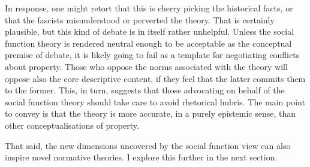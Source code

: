 In response, one might retort that this is cherry picking the historical facts, or that the fascists misunderstood or perverted the theory. That is certainly plausible, but this kind of debate is in itself rather unhelpful. Unless the social function theory is rendered neutral enough to be acceptable as the conceptual premise of debate, it is likely going to fail as a template for negotiating conflicts about property. Those who oppose the norms associated with the theory will oppose also the core descriptive content, if they feel that the latter commits them to the former. This, in turn, suggests that those advocating on behalf of the social function theory should take care to avoid rhetorical hubris. The main point to convey is that the theory is more accurate, in a purely epistemic sense, than other conceptualisations of property.

That said, the new dimensions uncovered by the social function view can also inspire novel normative theories. I explore this further in the next section.

